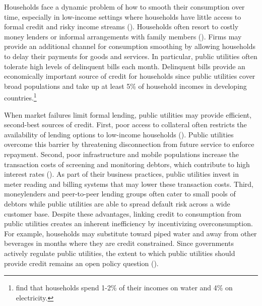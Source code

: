 \documentclass[12pt]{article}
\begin{document}
Households face a dynamic problem of how to smooth their consumption over time, especially in low-income settings where households have little access to formal credit and risky income streams (\cite{morduch1995income}).  Households often resort to costly money lenders or informal arrangements with family members (\cite{banerjee2007economic}).  Firms may provide an additional channel for consumption smoothing by allowing households to delay their payments for goods and services.  In particular, public utilities often tolerate high levels of delinquent bills each month.  Delinquent bills provide an economically important source of credit for households since public utilities cover broad populations and take up at least  5\% of household incomes in developing countries.\footnote{\cite{komives2006distributional} find that households spend 1-2\% of their incomes on water and 4\% on electricity.} 

When market failures limit formal lending, public utilities may provide efficient, second-best sources of credit.  First, poor access to collateral often restricts the availability of  lending options to low-income households (\cite{jack2016borrowing}).  Public utilities overcome this barrier by threatening disconnection from future service to enforce repayment.  Second, poor infrastructure and mobile populations increase the transaction costs of screening and monitoring debtors, which contribute to high interest rates (\cite{jack2014risk}).  As part of their business practices, public utilities invest in meter reading and billing systems that may lower these transaction costs.  Third, moneylenders and peer-to-peer lending groups often cater to small pools of debtors while public utilities are able to spread default risk across a wide customer base.  Despite these advantages, linking credit to consumption from public utilities creates an inherent inefficiency by incentivizing overconsumption.  For example, households may substitute toward piped water and away from other beverages in months where they are credit constrained.  Since governments actively regulate public utilities, the extent to which public utilities should provide credit remains an open policy question (\cite{laffont2005regulation}).  
\end{document}
